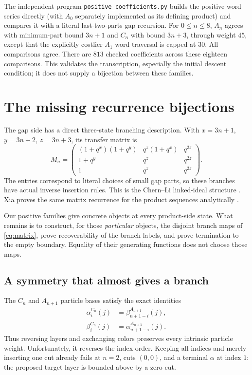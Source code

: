\documentclass[11pt,a4paper]{article}
\theoremstyle{definition}
\begin{document}
The independent program \texttt{positive\_coefficients.py} builds the positive
word series directly (with $A_0$ separately implemented as its defining product)
and compares it with a literal last-two-parts gap
recursion. For $0\le n\le8$, $A_n$ agrees with minimum-part bound $3n+1$
and $C_n$ with bound $3n+3$, through weight $45$, except that the explicitly
costlier $A_1$ word traversal is capped at $30$. All comparisons agree.
There are $813$ checked coefficients across these eighteen comparisons.
This validates the transcription, especially the initial descent condition;
it does not supply a bijection between these families.

\section{The missing recurrence bijections}\label{sec:gap}

The gap side has a direct three-state branching description. With
$x=3n+1$, $y=3n+2$, $z=3n+3$, its transfer matrix is
\begin{equation}\label{eq:matrix}
M_n=
\begin{pmatrix}
(1+q^x)(1+q^y)&q^z(1+q^x)&q^{2z}\\
1+q^y&q^z&q^{2z}\\
1&q^z&q^{2z}
\end{pmatrix}.
\end{equation}
The entries correspond to literal choices of small gap parts, so these
branches have actual inverse insertion rules. This is the Chern--Li
linked-ideal structure \cite{chernli}. Xia proves the same matrix recurrence
for the product sequences analytically \cite{xia}.

Our positive families give concrete objects at every product-side state.
What remains is to construct, for those \emph{particular} objects,
the disjoint branch maps of \eqref{eq:matrix}, prove recoverability of the
branch labels, and prove termination to the empty boundary.
Equality of their generating functions does not choose those maps.

\subsection{A symmetry that almost gives a branch}

The $C_n$ and $A_{n+1}$ particle bases satisfy the exact identities
\begin{align}
\alpha_i^{C_n}(j)&=\beta_{n+1-i}^{A_{n+1}}(j),\\
\beta_i^{C_n}(j)&=\alpha_{n+1-i}^{A_{n+1}}(j).
\end{align}
Thus reversing layers and exchanging colors preserves every intrinsic
particle weight. Unfortunately, it reverses the index order.
Keeping all indices and merely inserting one cut already fails at
$n=2$, cuts $(0,0)$, and a terminal $\alpha$ at index $1$:
the proposed target layer is bounded above by a zero cut.
\end{document}
